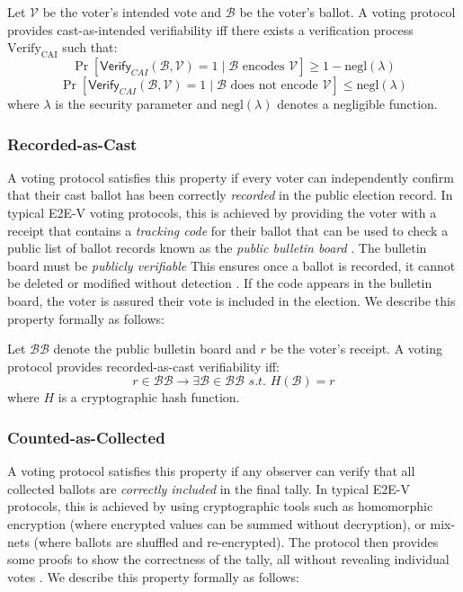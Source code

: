 \begin{definition}
Let $\mathcal{V}$ be the voter's intended vote and $\mathcal{B}$ be the voter's ballot. 
A voting protocol provides cast-as-intended verifiability iff there exists a verification process $\text{Verify}_{\text{CAI}}$ such that:
\begin{equation*}
\Pr[\mathsf{Verify}_{CAI}(\mathcal{B}, \mathcal{V}) = 1 \mid \mathcal{B} \text{ encodes } \mathcal{V}] \geq 1 - \text{negl}(\lambda)
\end{equation*}
\begin{equation*}
\Pr[\mathsf{Verify}_{CAI}(\mathcal{B}, \mathcal{V}) = 1 \mid \mathcal{B} \text{ does not encode } \mathcal{V}] \leq \text{negl}(\lambda)
\end{equation*}
where $\lambda$ is the security parameter and $\text{negl}(\lambda)$ denotes a negligible function.
\end{definition}

\subsubsection{Recorded-as-Cast}
A voting protocol satisfies this property if every voter can independently confirm that their cast ballot has been correctly \emph{recorded} in the public election record.
In typical E2E-V voting protocols, this is achieved by providing the voter with a receipt that contains a \emph{tracking code} for their ballot that can be used to check a public list of ballot records known as the \emph{public bulletin board} \cite{guasch2016challenge}.
The bulletin board must be \textit{publicly verifiable} 
This ensures once a ballot is recorded, it cannot be deleted or modified without detection \cite{CRST15}.
If the code appears in the bulletin board, the voter is assured their vote is included in the election.
We describe this property formally as follows:

\begin{definition}
Let $\mathcal{BB}$ denote the public bulletin board and $r$ be the voter's receipt. 
A voting protocol provides recorded-as-cast verifiability iff:
\begin{equation*}
r \in \mathcal{BB} \rightarrow \exists \mathcal{B} \in \mathcal{BB}\,\, s.t. \,\,H(\mathcal{B}) = r
\end{equation*}
where $H$ is a cryptographic hash function.
\end{definition}

\subsubsection{Counted-as-Collected}
A voting protocol satisfies this property if any observer can verify that all collected ballots are \emph{correctly included} in the final tally. 
In typical E2E-V protocols, this is achieved by using cryptographic tools such as homomorphic encryption (where encrypted values can be summed without decryption), or mix-nets (where ballots are shuffled and re-encrypted).
The protocol then provides some proofs to show the correctness of the tally, all without revealing individual votes \cite{HS00}.
We describe this property formally as follows:

